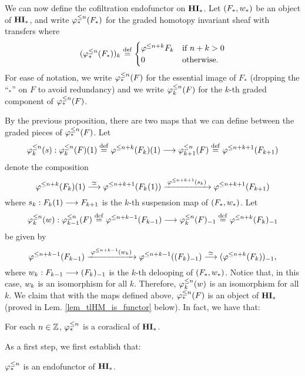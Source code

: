 We can now define the cofiltration endofunctor on $\HM$. Let
$(F_*, \deloop_*)$ be an object of $\HM$, and write $\tlHM{n}(F_*)$ 
for the graded homotopy invariant sheaf with transfers where
\[
(\tlHM{n}(F_*))_k \defeq
\begin{cases}
   \tlHI{n + k}F_k & \textrm{if } n + k > 0 \\
   0               & \textrm{otherwise}.
\end{cases}
\]
For ease of notation, we write $\tlHM{n}(F)$ for the essential 
image of $F_*$ (dropping the ``$_*$'' on $F$ to avoid 
redundancy) and we write $\tlHM[k]{n}(F)$ for the $k$-th graded 
component of $\tlHM{n}(F)$.

By the previous proposition, there are two maps that we can
define between the graded pieces of $\tlHM{n}(F)$. Let
\[
\suspTL[k]{n} : \LHI{\tlHM[k]{n}(F)} \defeq 
   \LHI{\tlHI{n + k}(F_k)} \to \tlHM[k + 1]{n}(F) \defeq 
   \tlHI{n + k + 1}(F_{k + 1})
\]
denote the composition
\begin{equation}\label{eq_susp_def}
\LHI{\tlHI{n + k}(F_k)} \stackrel{\simeq}{\to} 
   \tlHI{n + k + 1}(\LHI{F_k}) 
   \xrightarrow{\;\tlHI{n + k + 1}(\susp_k)\;} 
   \tlHI{n + k + 1}(F_{k + 1})
\end{equation}
where $\susp_k: \LHI{F_k} \to F_{k + 1}$ is the $k$-th suspension 
map of $(F_*, \deloop_*)$. Let
\[
\deloopTL[k]{n} : \tlHM[k - 1]{n}(F) \defeq 
   \tlHI{n + k - 1}(F_{k - 1}) \to \RHI{\tlHM[k]{n}(F)} \defeq 
   \RHI{\tlHI{n + k}(F_{k})} 
\]
be given by
\begin{equation}\label{eq_deloop_def}
\tlHI{n + k - 1}(F_{k - 1})
   \xrightarrow{\;\tlHI{n + k - 1}(\deloop_k)\;} 
   \tlHI{n + k - 1}(\RHI{(F_k)}) \stackrel{\simeq}{\to} 
   \RHI{(\tlHI{n + k}(F_k))},
\end{equation}
where $\deloop_k: F_{k - 1} \to \RHI{(F_k)}$ is the $k$-th delooping
of $(F_*, \deloop_*)$. Notice that, in this case, $\deloop_k$ is
an isomorphism for all $k$. Therefore, $\deloopTL[k]{n}$ is an 
isomorphism for all $k$. We claim that with the maps defined above,
$\tlHM{n}(F)$ is an object of $\HM$ (proved in Lem. 
\ref{lem_tlHM_is_functor} below). In fact, we have that:

\begin{thm}\label{thm_tlHM_corad}
For each $n \in \Z$, $\tlHM{n}$ is a coradical of $\HM$.
\end{thm}

As a first step, we first establish that:

\begin{lem}\label{lem_tlHM_is_functor}
$\tlHM{n}$ is an endofunctor of $\HM$.
\end{lem}

